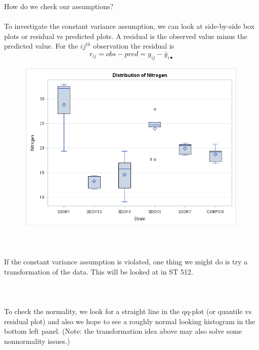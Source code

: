 \newpage

How do we check our assumptions? \\~\\
To investigate the constant variance assumption, we can look at side-by-side box plots or residual vs predicted plots.  A residual is the observed value minus the predicted value.  For the $ij^{th}$ observation the residual is
$$r_{ij}=obs-pred=y_{ij}-\bar{y}_{i\bullet}$$

\begin{figure}
	\begin{center}
		\includegraphics[scale=0.55]{cloveranova2}
  \end{center}
\end{figure}
~\\~\\
If the constant variance assumption is violated, one thing we might do is try a transformation of the data.  This will be looked at in ST 512.\\~\\~\\~\\
To check the normality, we look for a straight line in the qq-plot (or quantile vs residual plot) and also we hope to see a roughly normal looking histogram in the bottom left panel.  (Note: the transformation idea above may also solve some nonnormality issues.)\\~\\

